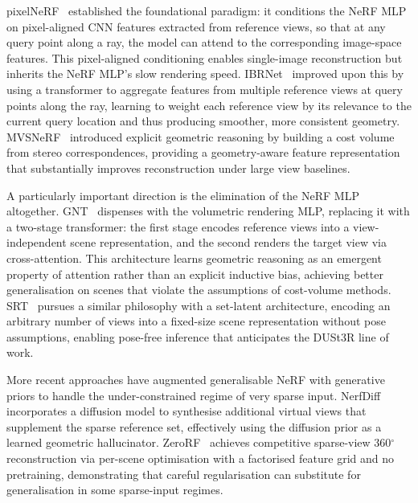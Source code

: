 pixelNeRF~\citep{yu2021pixelnerf} established the foundational paradigm:
it conditions the NeRF MLP on pixel-aligned CNN features extracted from
reference views, so that at any query point along a ray, the model can
attend to the corresponding image-space features.
This pixel-aligned conditioning enables single-image reconstruction but
inherits the NeRF MLP's slow rendering speed.
IBRNet~\citep{wang2021ibrnet} improved upon this by using a transformer to
aggregate features from multiple reference views at query points along the ray,
learning to weight each reference view by its relevance to the current
query location and thus producing smoother, more consistent geometry.
MVSNeRF~\citep{chen2021mvsnerf} introduced explicit geometric reasoning
by building a cost volume from stereo correspondences, providing a
geometry-aware feature representation that substantially improves reconstruction
under large view baselines.

A particularly important direction is the elimination of the NeRF MLP
altogether.
GNT~\citep{wang2022gnt} dispenses with the volumetric rendering MLP,
replacing it with a two-stage transformer: the first stage encodes reference
views into a view-independent scene representation, and the second renders
the target view via cross-attention.
This architecture learns geometric reasoning as an emergent property of
attention rather than an explicit inductive bias, achieving better
generalisation on scenes that violate the assumptions of cost-volume methods.
SRT~\citep{sajjadi2022srt} pursues a similar philosophy with a
set-latent architecture, encoding an arbitrary number of views into a
fixed-size scene representation without pose assumptions, enabling
pose-free inference that anticipates the DUSt3R line of work.

More recent approaches have augmented generalisable NeRF with generative priors
to handle the under-constrained regime of very sparse input.
NerfDiff~\citep{gu2023nerfdiff} incorporates a diffusion model to synthesise
additional virtual views that supplement the sparse reference set, effectively
using the diffusion prior as a learned geometric hallucinator.
ZeroRF~\citep{shi2023zerorf} achieves competitive sparse-view 360$^\circ$
reconstruction via per-scene optimisation with a factorised feature grid and
no pretraining, demonstrating that careful regularisation can substitute for
generalisation in some sparse-input regimes.

